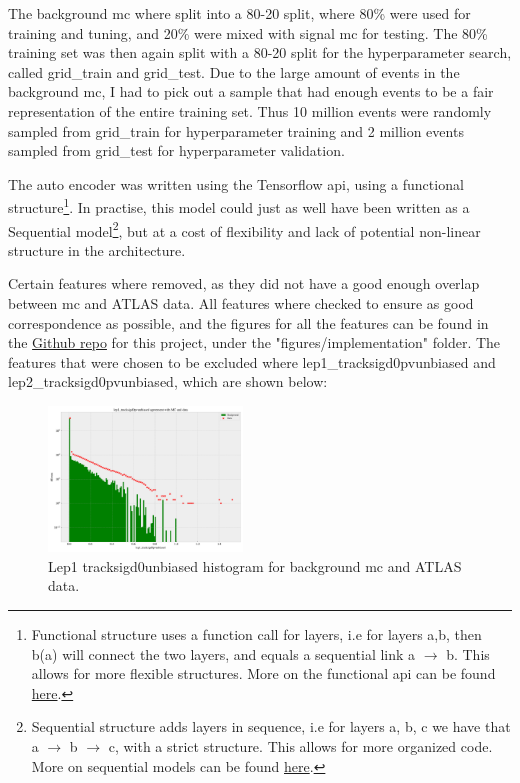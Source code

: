 \documentclass[ reprint, amsmath,amssymb, aps, nofootinbib]{revtex4-2}
\begin{document}
The background mc where split into a 80-20 split, where 80\% were used for training and tuning, and 20\% were mixed with signal mc for testing. The 80\% training set was then again split with a 80-20 split for the hyperparameter search, called grid\_train and grid\_test. Due to the large amount of events in the background mc, I had to pick out a sample that had enough events to be a fair representation of the entire training set. Thus 10 million events were randomly sampled from grid\_train for hyperparameter training and 2 million events sampled from grid\_test for hyperparameter validation. \par 

The auto encoder was written using the Tensorflow api\cite{tensorflow2015-whitepaper}\cite{chollet2015keras}, using a functional structure\footnote{Functional structure uses a function call for layers, i.e for layers a,b, then b(a) will connect the two layers, and equals a sequential link a $\to$ b. This allows for more flexible structures. More on the functional api can be found \href{https://www.tensorflow.org/guide/keras/functional}{here}.}. In practise, this model could just as well have been written as a Sequential model\footnote{Sequential structure adds layers in sequence, i.e for layers a, b, c we have that a $\to$ b $\to$ c, with a strict structure. This allows for more organized code. More on sequential models can be found \href{https://www.tensorflow.org/guide/keras/sequential_model}{here}.}, but at a cost of flexibility and lack of potential non-linear structure in the architecture. \par 

Certain features where removed, as they did not have a good enough overlap between mc and ATLAS data. All features where checked to ensure as good correspondence as possible, and the figures for all the features can be found in the \href{https://github.com/Gadangadang/FYS5555/tree/main/Project3}{Github repo} for this project, under the "figures/implementation" folder. The features that were chosen to be excluded where lep1\_tracksigd0pvunbiased and lep2\_tracksigd0pvunbiased, which are shown below:

\begin{figure}[H]
    \centering
    \includegraphics[width=0.46\textwidth]{figures/implementation/lep1_tracksigd0pvunbiased.pdf}
    \caption{Lep1 tracksigd0unbiased histogram for background mc and ATLAS data. }
    \label{fig:lep1sigd0}
\end{figure}
\end{document}
